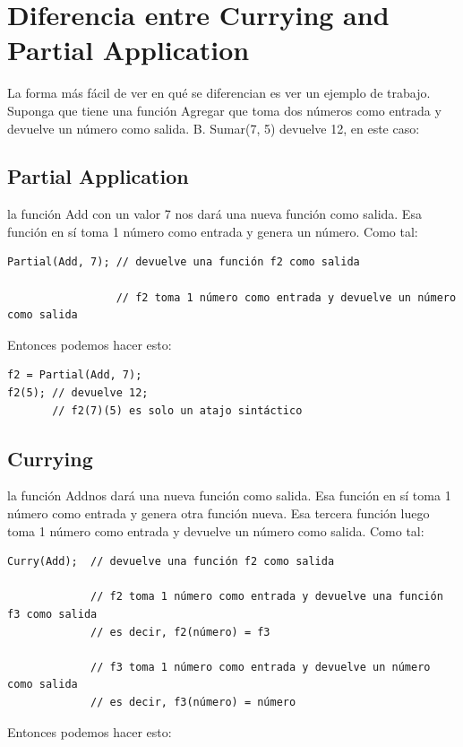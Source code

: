 \documentclass{article}
\begin{document}
\section{Diferencia entre Currying and Partial Application}

La forma más fácil de ver en qué se diferencian es ver un ejemplo de trabajo. Suponga que tiene una función Agregar que toma dos números como entrada y devuelve un número como salida. B. Sumar(7, 5) devuelve 12, en este caso:

\subsection{Partial Application}

la función Add con un valor 7 nos dará una nueva función como salida. Esa función en sí toma 1 número como entrada y genera un número. Como tal:

\begin{verbatim}
Partial(Add, 7); // devuelve una función f2 como salida

                 // f2 toma 1 número como entrada y devuelve un número como salida
\end{verbatim}
Entonces podemos hacer esto:

\begin{verbatim}
f2 = Partial(Add, 7);
f2(5); // devuelve 12;
       // f2(7)(5) es solo un atajo sintáctico
\end{verbatim}

\subsection{Currying}

la función Addnos dará una nueva función como salida. Esa función en sí toma 1 número como entrada y genera otra función nueva. Esa tercera función luego toma 1 número como entrada y devuelve un número como salida. Como tal:

\begin{verbatim}
Curry(Add);  // devuelve una función f2 como salida

             // f2 toma 1 número como entrada y devuelve una función f3 como salida
             // es decir, f2(número) = f3

             // f3 toma 1 número como entrada y devuelve un número como salida
             // es decir, f3(número) = número
\end{verbatim}

Entonces podemos hacer esto:
\end{document}
